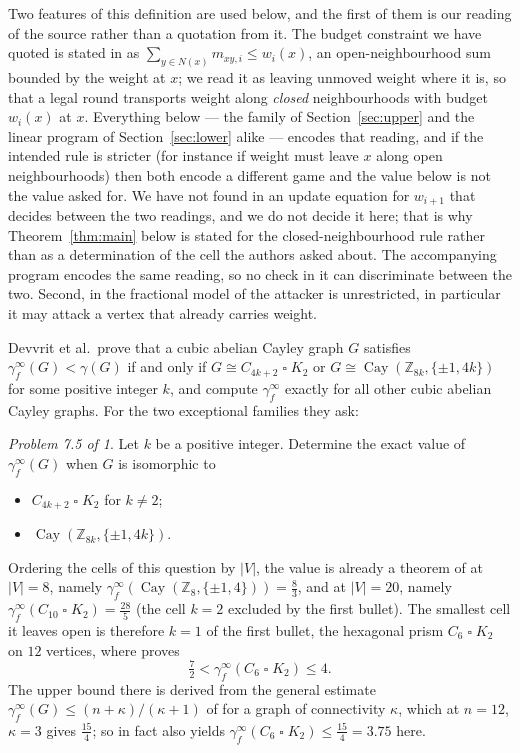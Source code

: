 \documentclass[11pt]{amsart}
\theoremstyle{remark}
\newtheorem*{problem}{Problem 7.5 of \cite{FED}}
\newcommand{\fed}{\gamma_f^{\infty}}
\newcommand{\Z}{\mathbb{Z}}
\newcommand{\Cay}{\operatorname{Cay}}
\begin{document}
Two features of this definition are used below, and the first of them is our
reading of the source rather than a quotation from it. The budget constraint we
have quoted is stated in \cite{FED} as
$\sum_{y\in N(x)}m_{xy,i}\le w_i(x)$, an open-neighbourhood sum bounded by the
weight at $x$; we read it as leaving unmoved weight where it is, so that a
legal round transports weight along \emph{closed} neighbourhoods with budget
$w_i(x)$ at $x$. Everything below --- the family of
Section~\ref{sec:upper} and the linear program of Section~\ref{sec:lower}
alike --- encodes that reading, and if the intended rule is stricter (for
instance if weight must leave $x$ along open neighbourhoods) then both encode a
different game and the value below is not the value asked for. We have not
found in \cite{FED} an update equation for $w_{i+1}$ that decides between the
two readings, and we do not decide it here; that is why
Theorem~\ref{thm:main} below is stated for the closed-neighbourhood rule rather
than as a determination of the cell the authors asked about. The accompanying
program encodes the same reading, so no check in it can discriminate between
the two. Second, in the
fractional model of \cite{FED} the attacker is unrestricted, in particular it
may attack a vertex that already carries weight.

Devvrit et al.\ prove that a cubic abelian Cayley graph $G$ satisfies
$\fed(G)<\gamma(G)$ if and only if $G\cong C_{4k+2}\mathbin{\square}K_2$ or
$G\cong\Cay(\Z_{8k},\{\pm1,4k\})$ for some positive integer $k$, and compute
$\fed$ exactly for all other cubic abelian Cayley graphs. For the two
exceptional families they ask:

\begin{problem}
Let $k$ be a positive integer. Determine the exact value of $\fed(G)$ when $G$
is isomorphic to
\begin{itemize}
\item $C_{4k+2}\mathbin{\square}K_2$ for $k\ne2$;
\item $\Cay(\Z_{8k},\{\pm1,4k\})$.
\end{itemize}
\end{problem}

\noindent
Ordering the cells of this question by $|V|$, the value is already a theorem of
\cite{FED} at $|V|=8$, namely $\fed(\Cay(\Z_8,\{\pm1,4\}))=\tfrac83$, and at
$|V|=20$, namely $\fed(C_{10}\mathbin{\square}K_2)=\tfrac{28}{5}$ (the cell
$k=2$ excluded by the first bullet). The smallest cell it leaves open is
therefore $k=1$ of the first bullet, the hexagonal prism
$C_6\mathbin{\square}K_2$ on $12$ vertices, where \cite{FED} proves
\[
  \tfrac72<\fed(C_6\mathbin{\square}K_2)\le4 .
\]
The upper bound there is derived from the general estimate
$\fed(G)\le(n+\kappa)/(\kappa+1)$ of \cite{FED} for a graph of connectivity
$\kappa$, which at $n=12$, $\kappa=3$ gives $\tfrac{15}{4}$; so \cite{FED} in
fact also yields $\fed(C_6\mathbin{\square}K_2)\le\tfrac{15}{4}=3.75$ here.
\end{document}
